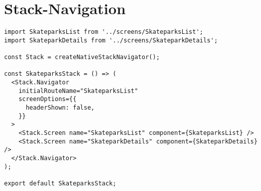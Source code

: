 \section{Stack-Navigation}


\begin{lstlisting}
import SkateparksList from '../screens/SkateparksList';
import SkateparkDetails from '../screens/SkateparkDetails';

const Stack = createNativeStackNavigator();

const SkateparksStack = () => (
  <Stack.Navigator
    initialRouteName="SkateparksList"
    screenOptions={{
      headerShown: false,
    }}
  >
    <Stack.Screen name="SkateparksList" component={SkateparksList} />
    <Stack.Screen name="SkateparkDetails" component={SkateparkDetails} />
  </Stack.Navigator>
);

export default SkateparksStack;
\end{lstlisting}